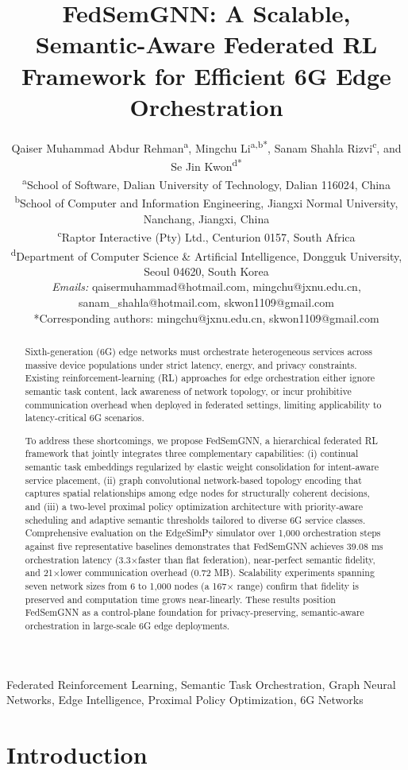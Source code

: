 \documentclass[conference]{IEEEtran}
\title{FedSemGNN: A Scalable, Semantic-Aware Federated RL Framework for Efficient 6G Edge Orchestration}
\author{
	Qaiser Muhammad Abdur Rehman\textsuperscript{a}, 
	Mingchu Li\textsuperscript{a,b*}, 
	Sanam Shahla Rizvi\textsuperscript{c}, 
	and Se Jin Kwon\textsuperscript{d*} \\[4pt]
	\textsuperscript{a}School of Software, Dalian University of Technology, Dalian 116024, China\\
	\textsuperscript{b}School of Computer and Information Engineering, Jiangxi Normal University, Nanchang, Jiangxi, China\\
	\textsuperscript{c}Raptor Interactive (Pty) Ltd., Centurion 0157, South Africa\\
	\textsuperscript{d}Department of Computer Science \& Artificial Intelligence, Dongguk University, Seoul 04620, South Korea\\[6pt]
	\textit{Emails:} qaisermuhammad@hotmail.com, mingchu@jxnu.edu.cn, 
	sanam\_shahla@hotmail.com, skwon1109@gmail.com\\[2pt]
	*Corresponding authors: mingchu@jxnu.edu.cn, skwon1109@gmail.com
}
\begin{document}
	
	\maketitle
	
	\begin{abstract}\textcolor{revblue}
		Sixth-generation (6G) edge networks must orchestrate heterogeneous services across massive device populations
		under strict latency, energy, and privacy constraints. Existing reinforcement-learning (RL) approaches for edge orchestration either ignore semantic task content, lack awareness of network topology, or incur prohibitive communication overhead when deployed in federated settings, limiting applicability to latency-critical 6G scenarios.
		
		To address these shortcomings, we propose FedSemGNN, a hierarchical federated RL framework that jointly integrates three complementary capabilities: (i) continual semantic task embeddings regularized by elastic weight consolidation for intent-aware service placement, (ii) graph convolutional network-based topology encoding that captures
		spatial relationships among edge nodes for structurally coherent decisions, and (iii) a two-level proximal policy optimization architecture with priority-aware scheduling and adaptive semantic thresholds tailored to diverse 6G service classes. Comprehensive evaluation on the EdgeSimPy simulator over 1,000 orchestration steps against five representative baselines demonstrates that FedSemGNN achieves 39.08 ms orchestration latency (3.3×faster than flat federation), near-perfect semantic fidelity, and 21×lower communication overhead (0.72 MB). Scalability experiments spanning seven network sizes from 6 to 1,000 nodes (a	167× range) confirm that fidelity is preserved and computation time grows near-linearly. These results position FedSemGNN as a	control-plane foundation for privacy-preserving, semantic-aware orchestration in large-scale 6G edge deployments.
	\end{abstract}
	
	
	\begin{IEEEkeywords}
		Federated Reinforcement Learning, Semantic Task Orchestration, Graph Neural Networks, Edge Intelligence, Proximal Policy Optimization, 6G Networks
	\end{IEEEkeywords}
	
	
	\section{Introduction}
	
\end{document}
